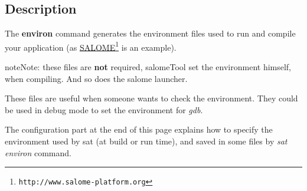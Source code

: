 \documentclass[a4paper,10pt,english]{sphinxmanual}
\begin{document}
\subsection{Description}
\label{commands/environ:description}
The \textbf{environ} command generates the environment files used
to run and compile your application (as \href{http://www.salome-platform.org}{SALOME}\footnote[10]{\sphinxAtStartFootnote%
\nolinkurl{http://www.salome-platform.org}
} is an example).

\begin{notice}{note}{Note:}
these files are \textbf{not} required,
salomeTool set the environment himself, when compiling.
And so does the salome launcher.

These files are useful when someone wants to check the environment.
They could be used in debug mode to set the environment for \emph{gdb}.
\end{notice}

The configuration part at the end of this page explains how
to specify the environment used by sat (at build or run time),
and saved in some files by \emph{sat environ} command.
\end{document}
